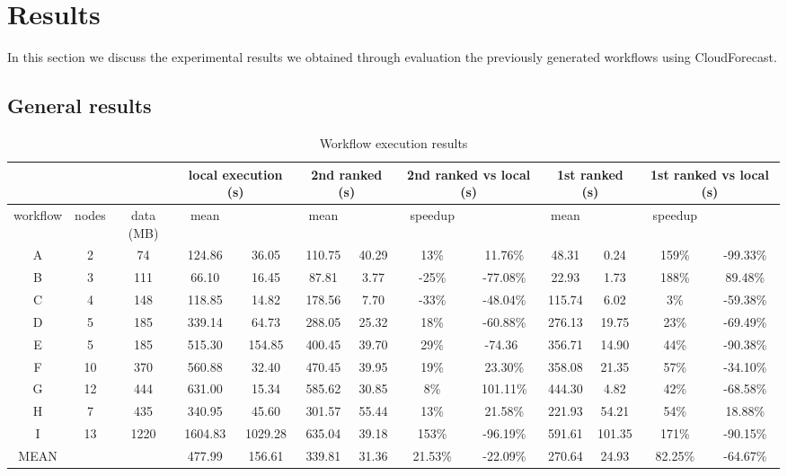 \documentclass[10pt, conference, compsocconf]{IEEEtran}
\newcommand{\sysname}{CloudForecast\xspace}
\begin{document}
\section{Results}
\label{sec:results}
In this section we discuss the experimental results we obtained through evaluation the previously generated workflows using \sysname.

\subsection{General results}






\begin{table*}[!t]
\renewcommand{\arraystretch}{1.2}
\caption{Workflow execution results}
\label{tab:wf_execution}
\centering
\begin{tabular}{|ccc|||cc||cc|cc||cc|cc|}
\multicolumn{3}{c}{}& \multicolumn{2}{c}{local execution (s)} & \multicolumn{2}{c}{2nd ranked (s)} & \multicolumn{2}{c}{2nd ranked vs local (s)} & \multicolumn{2}{c}{1st ranked (s)} & \multicolumn{2}{c}{1st ranked vs local (s)} \\
\hline
workflow & nodes & data (MB) & mean &  & mean &  & speedup &   & mean &   & speedup & \\
\hline
A  & 2 &   74   &124.86 & 36.05 & 110.75 &   40.29 &  13\%  &  11.76\%  & 48.31    & 0.24   &   159\% & -99.33\%     \\
B  & 3 &   111   &66.10 & 16.45 & 87.81 &      3.77 &  -25\%  & -77.08\%  & 22.93    & 1.73   &  188\% &  89.48\%     \\
C  & 4 &   148   &118.85 & 14.82 & 178.56 &    7.70 &  -33\%  &  -48.04\% & 115.74  & 6.02   &   3\%   &  -59.38\%    \\
D  & 5 &   185   &339.14 & 64.73 & 288.05 &   25.32 &  18\%  &   -60.88\% & 276.13    & 19.75   &23\%  &   -69.49\%      \\
E  & 5 &   185   &515.30 & 154.85 & 400.45 &   39.70 &  29\%  &   -74.36\ & 356.71    & 14.90   &44\%  &  -90.38\%       \\
F  & 10 &  370   & 560.88 & 32.40 & 470.45 &   39.95 & 19\%   &  23.30\%  & 358.08    & 21.35   &57\%  &   -34.10\%     \\
G  & 12 &  444   & 631.00 & 15.34 & 585.62 &  30.85 &   8\%  &   101.11\% & 444.30   & 4.82   &  42\%  &  -68.58\%     \\
H & 7 & 435 & 340.95 & 45.60 &  301.57 & 55.44 & 13\% & 21.58\%       & 221.93 & 54.21 & 54\% & 18.88\% \\
I & 13 & 1220 & 1604.83 & 1029.28       &  635.04 & 39.18 & 153\% & -96.19\%     & 591.61 & 101.35 & 171\% & -90.15\%\\
\hline
MEAN & && 477.99 & 156.61 &        339.81 &  31.36 & 21.53\% & -22.09\%      &270.64 &  24.93 & 82.25\% & -64.67\%\\
\hline
\end{tabular}
\end{table*}
\end{document}
